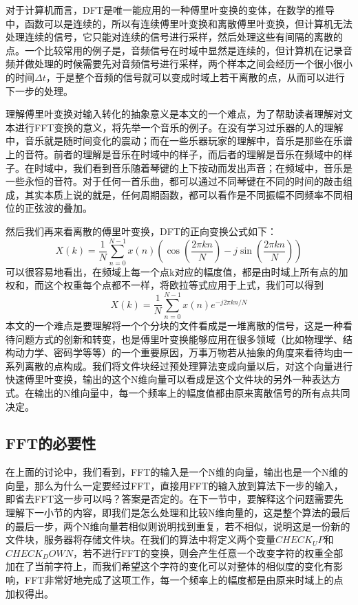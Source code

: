 对于计算机而言，DFT是唯一能应用的一种傅里叶变换的变体，在数学的推导中，函数可以是连续的，所以有连续傅里叶变换和离散傅里叶变换，但计算机无法处理连续的信号，它只能对连续的信号进行采样，然后处理这些有间隔的离散的点。一个比较常用的例子是，音频信号在时域中显然是连续的，但计算机在记录音频并做处理的时候需要先对音频信号进行采样，两个样本之间会经历一个很小很小的时间$\Delta t$，于是整个音频的信号就可以变成时域上若干离散的点，从而可以进行下一步的处理。

理解傅里叶变换对输入转化的抽象意义是本文的一个难点，为了帮助读者理解对文本进行FFT变换的意义，将先举一个音乐的例子。在没有学习过乐器的人的理解中，音乐就是随时间变化的震动；而在一些乐器玩家的理解中，音乐是那些在乐谱上的音符。前者的理解是音乐在时域中的样子，而后者的理解是音乐在频域中的样子。在时域中，我们看到音乐随着琴键的上下按动而发出声音；在频域中，音乐是一些永恒的音符。对于任何一首乐曲，都可以通过不同琴键在不同的时间的敲击组成，其实本质上说的就是，任何周期函数，都可以看作是不同振幅不同频率不同相位的正弦波的叠加。

然后我们再来看离散的傅里叶变换，DFT的正向变换公式如下：$$X(k)=\frac{1}{N}\sum_{n=0}^{N-1}x(n)(\cos(\frac{2\pi kn}{N}) - j\sin(\frac{2\pi kn}{N}))$$可以很容易地看出，在频域上每一个点k对应的幅度值，都是由时域上所有点的加权和，而这个权重每个点都不一样，将欧拉等式应用于上式，我们可以得到$$X(k)=\frac{1}{N}\sum_{n=0}^{N-1}x(n)e^{-j2\pi kn/N}$$本文的一个难点是要理解将一个个分块的文件看成是一堆离散的信号，这是一种看待问题方式的创新和转变，也是傅里叶变换能够应用在很多领域（比如物理学、结构动力学、密码学等等）的一个重要原因，万事万物若从抽象的角度来看待均由一系列离散的点构成。我们将文件块经过预处理算法变成向量以后，对这个向量进行快速傅里叶变换，输出的这个N维向量可以看成是这个文件块的另外一种表达方式。在输出的N维向量中，每一个频率上的幅度值都由原来离散信号的所有点共同决定。

\subsection{FFT的必要性}

在上面的讨论中，我们看到，FFT的输入是一个N维的向量，输出也是一个N维的向量，那么为什么一定要经过FFT，直接用FFT的输入放到算法下一步的输入，即省去FFT这一步可以吗？答案是否定的。在下一节中，要解释这个问题需要先理解下一小节的内容，即我们是怎么处理和比较N维向量的，这是整个算法的最后的最后一步，两个N维向量若相似则说明找到重复，若不相似，说明这是一份新的文件块，服务器将存储文件块。在我们的算法中将定义两个变量$CHECK_UP$和$CHECK_DOWN$，若不进行FFT的变换，则会产生任意一个改变字符的权重全部加在了当前字符上，而我们希望这个字符的变化可以对整体的相似度的变化有影响，FFT非常好地完成了这项工作，每一个频率上的幅度都是由原来时域上的点加权得出。

